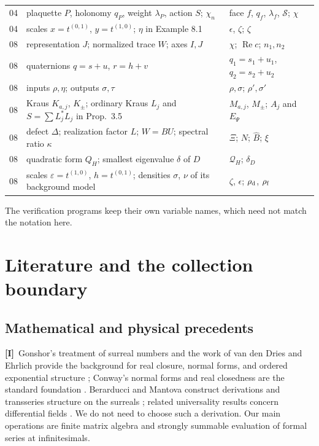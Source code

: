 \documentclass[11pt,oneside]{article}
\numberwithin{equation}{section}
\theoremstyle{plain}
\theoremstyle{definition}
\theoremstyle{remark}
\newcommand{\QH}{\mathcal Q_H}
\DeclareMathOperator{\Rea}{Re}
\newcommand{\TI}{\textcolor{TierI}{\textsf{\bfseries[I]}}}
\begin{document}
\begin{longtable}{@{}L{0.07\textwidth}L{0.40\textwidth}L{0.45\textwidth}@{}}
04 & plaquette $P$, holonomy $q_P$, weight $\lambda_P$, action $S$; $\chi_n$ & face $f$, $q_f$, $\lambda_f$, $\mathcal S$; $\chi$\\
04 & scales $x=t^{(0,1)}$, $y=t^{(1,0)}$; $\eta$ in Example 8.1 & $\epsilon$, $\zeta$; $\zeta$\\
08 & representation $J$; normalized trace $W$; axes $I,J$ & $\chi$; $\Rea c$; $n_1,n_2$\\
08 & quaternions $q=s+u$, $r=h+v$ & $q_1=s_1+u_1$, $q_2=s_2+u_2$\\
08 & inputs $\rho,\eta$; outputs $\sigma,\tau$ & $\rho,\sigma$; $\rho',\sigma'$\\
08 & Kraus $K_{a,j}$, $K_\pm$; ordinary Kraus $L_j$ and $S=\sum L_j^*L_j$ in Prop.~3.5 & $M_{a,j}$, $M_\pm$; $A_j$ and $E_\Psi$\\
08 & defect $\Delta$; realization factor $L$; $W=BU$; spectral ratio $\kappa$ & $\Xi$; $N$; $\widehat B$; $\xi$\\
08 & quadratic form $Q_H$; smallest eigenvalue $\delta$ of $D$ & $\QH$; $\delta_D$\\
08 & scales $\varepsilon=t^{(1,0)}$, $h=t^{(0,1)}$; densities $\sigma$, $\nu$ of its background model & $\zeta$, $\epsilon$; $\rho_{\rm d}$, $\rho_{\rm f}$\\
\end{longtable}

The verification programs keep their own variable names, which need not match the notation here.

\section{Literature and the collection boundary}\label{qgs:sec:sources}

\subsection{Mathematical and physical precedents}
\TI\ Gonshor's treatment of surreal numbers and the work of van den Dries and Ehrlich provide the background for real closure, normal forms, and ordered exponential structure \cite{Gonshor,vdDE}; Conway's normal forms and real closedness are the standard foundation \cite{Conway}. Berarducci and Mantova construct derivations and transseries structure on the surreals \cite{BM}; related universality results concern differential fields \cite{ADH}. We do not need to choose such a derivation. Our main operations are finite matrix algebra and strongly summable evaluation of formal series at infinitesimals.
\end{document}
